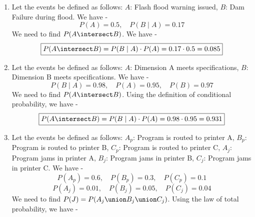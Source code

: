 \begin{enumerate}
        \begin{enumerate}
            \item We need to calculate $P(A\mid B) + P(A\mid B^C)$. We have - 
            $$P(A\mid B) + P(A\mid B^C) = \frac{P(A \intersect B)}{P(B)} + P(A \mid A) = 0 + 1 = 1$$
            \item We need to caculate $P(B\mid A) + P(A^C \mid B)$. We have - 
            $$P(B\mid A) + P(A^C \mid B) = \frac{P(B \intersect A)}{P(A)} + P(A^C \mid A^C) = 0 + 1 = 1$$ We can say that the conditional probabilites commute in this case because $A$ and $B$ are complements of each other. 
            \item If $A$ and $B$ were any two events (not necessarily a partition), the above results would not hold. The events $A$ and $B$ being a partition is crucial to the results in (a) and (b) since it ensures that $A\cap B=\emptyset$ and $A\cup B=S$. This property allows us to simplify the conditional probabilities in (a) and (b) to yield the results of $1$. If $A$ and $B$ were not a partition, we could not make these simplifications and the results would not hold in general.
        \end{enumerate}
        \item Let the events be defined as follows:
        $A$: Flash flood warning issued, $B$: Dam Failure during flood. We have - 
        $$P(A) = 0.5, \quad P(B \mid A) = 0.17$$
        We need to find $P(A \intersect B)$. We have -
        \[\boxed{P(A \intersect B) = P(B \mid A) \cdot P(A) = 0.17 \cdot 0.5 = 0.085
        }\]
        \item Let the events be defined as follows:
        $A$: Dimension A meets specifications, $B$: Dimension B meets specifications. We have - 
        $$P(B \mid A) = 0.98, \quad P(A) = 0.95, \quad P(B) = 0.97$$
        We need to find $P(A \intersect B)$. Using the definition of conditional probability, we have -
        \[\boxed{P(A \intersect B) = P(B \mid A) \cdot P(A) = 0.98 \cdot 0.95 = 0.931
        }\]
        \item Let the events be defined as follows:
        $A_p$: Program is routed to printer A, $B_p$: Program is routed to printer B, $C_p$: Program is routed to printer C, $A_j$: Program jams in printer A, $B_j$: Program jams in printer B, $C_j$: Program jams in printer C. We have -
        $$P(A_p) = 0.6, \quad P(B_p) = 0.3, \quad P(C_p) = 0.1$$
        $$P(A_j) = 0.01, \quad P(B_j) = 0.05, \quad P(C_j) = 0.04$$
        We need to find $P(J) = P(A_j \union B_j \union C_j)$. Using the law of total probability, we have -

\end{enumerate}
